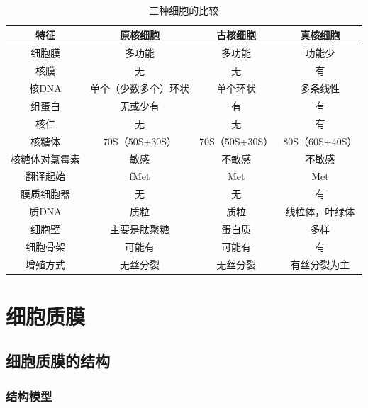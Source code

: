 \begin{table}[htbp]
\centering
\begin{tabularx}{\textwidth}{|C|c|c|c|}
	\hline
	\textbf{特征} & \textbf{原核细胞} & \textbf{古核细胞} & \textbf{真核细胞} \\ \hline
	细胞膜 & 多功能 & 多功能 & 功能少 \\ \hline
	核膜 & 无 & 无 & 有 \\ \hline
	核DNA & 单个（少数多个）环状 & 单个环状 & 多条线性 \\ \hline
	组蛋白 & 无或少有 & 有 & 有 \\ \hline
	核仁 & 无 & 无 & 有 \\ \hline
	核糖体 & 70S（50S+30S） & 70S（50S+30S） & 80S（60S+40S） \\ \hline
	核糖体对氯霉素 & 敏感 & 不敏感 & 不敏感 \\ \hline
	翻译起始 & fMet & Met & Met \\ \hline
	膜质细胞器 & 无 & 无 & 有 \\ \hline
	质DNA & 质粒 & 质粒 & 线粒体，叶绿体 \\ \hline
	细胞壁 & 主要是肽聚糖 & 蛋白质 & 多样 \\ \hline
	细胞骨架 & 可能有 & 可能有 & 有 \\ \hline
	增殖方式 & 无丝分裂 & 无丝分裂 & 有丝分裂为主 \\ \hline
\end{tabularx}
\caption{三种细胞的比较}
\label{tab:三种细胞的比较}
\end{table}

\section{细胞质膜}

\subsection{细胞质膜的结构}

\subsubsection{结构模型}

